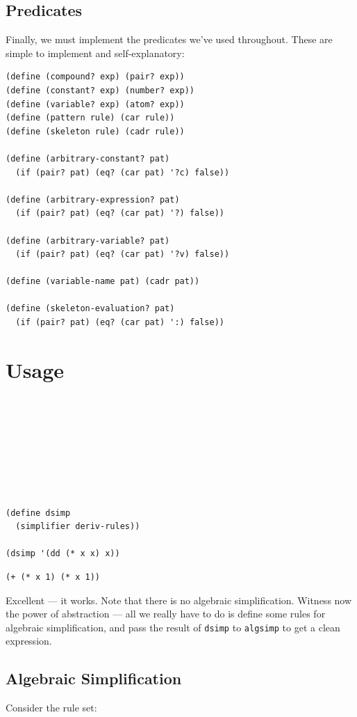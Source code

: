 \documentclass[9pt]{report}
\begin{document}
\subsection{Predicates}
\label{sec:org7240b68}
Finally, we must implement the predicates we've used throughout.
These are simple to implement and self-explanatory:

\begin{verbatim}
(define (compound? exp) (pair? exp))
(define (constant? exp) (number? exp))
(define (variable? exp) (atom? exp))
(define (pattern rule) (car rule))
(define (skeleton rule) (cadr rule))

(define (arbitrary-constant? pat)
  (if (pair? pat) (eq? (car pat) '?c) false))

(define (arbitrary-expression? pat)
  (if (pair? pat) (eq? (car pat) '?) false))

(define (arbitrary-variable? pat)
  (if (pair? pat) (eq? (car pat) '?v) false))

(define (variable-name pat) (cadr pat))

(define (skeleton-evaluation? pat)
  (if (pair? pat) (eq? (car pat) ':) false))
\end{verbatim}

\section{Usage}
\label{sec:org8835a78}

\begin{verbatim}








(define dsimp
  (simplifier deriv-rules))

(dsimp '(dd (* x x) x))
\end{verbatim}

\begin{verbatim}
(+ (* x 1) (* x 1))
\end{verbatim}


Excellent --- it works. Note that there is no algebraic
simplification. Witness now the power of abstraction --- all we
really have to do is define some rules for algebraic
simplification, and pass the result of \texttt{dsimp} to \texttt{algsimp} to get
a clean expression.

\subsection{Algebraic Simplification}
\label{sec:orgc8fca96}
Consider the rule set:
\end{document}
